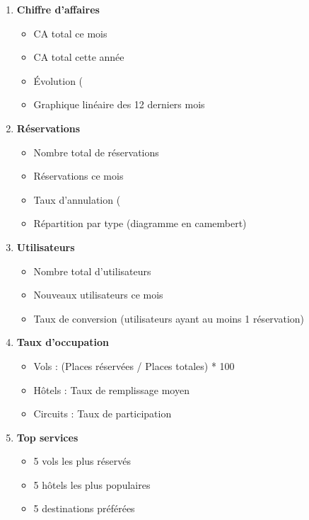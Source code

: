 \documentclass[12pt,a4paper]{report}
\begin{document}
\begin{enumerate}
    \item \textbf{Chiffre d'affaires}
    \begin{itemize}
        \item CA total ce mois
        \item CA total cette année
        \item Évolution (%
        \item Graphique linéaire des 12 derniers mois
    \end{itemize}
    
    \item \textbf{Réservations}
    \begin{itemize}
        \item Nombre total de réservations
        \item Réservations ce mois
        \item Taux d'annulation (%
        \item Répartition par type (diagramme en camembert)
    \end{itemize}
    
    \item \textbf{Utilisateurs}
    \begin{itemize}
        \item Nombre total d'utilisateurs
        \item Nouveaux utilisateurs ce mois
        \item Taux de conversion (utilisateurs ayant au moins 1 réservation)
    \end{itemize}
    
    \item \textbf{Taux d'occupation}
    \begin{itemize}
        \item Vols : (Places réservées / Places totales) * 100
        \item Hôtels : Taux de remplissage moyen
        \item Circuits : Taux de participation
    \end{itemize}
    
    \item \textbf{Top services}
    \begin{itemize}
        \item 5 vols les plus réservés
        \item 5 hôtels les plus populaires
        \item 5 destinations préférées
    \end{itemize}
\end{enumerate}
\end{document}

